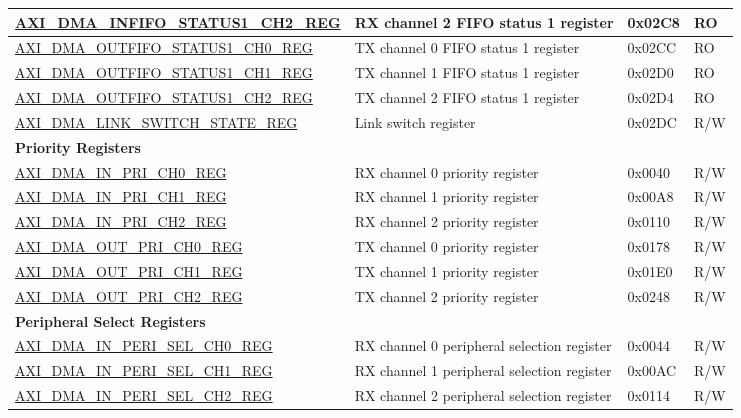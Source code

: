 \begin{longtable}{ | l | p{10cm} | p{1.3cm} | l | }
\hyperref[regdesc:AXIDMAINFIFOSTATUS1CHNREG]{AXI\_DMA\_INFIFO\_STATUS1\_CH2\_REG} & RX channel 2 FIFO status 1 register & 0x02C8 & RO \\ \hline
\hyperref[regdesc:AXIDMAOUTFIFOSTATUS1CHNREG]{AXI\_DMA\_OUTFIFO\_STATUS1\_CH0\_REG} & TX channel 0 FIFO status 1 register & 0x02CC & RO \\ \hline
\hyperref[regdesc:AXIDMAOUTFIFOSTATUS1CHNREG]{AXI\_DMA\_OUTFIFO\_STATUS1\_CH1\_REG} & TX channel 1 FIFO status 1 register & 0x02D0 & RO \\ \hline
\hyperref[regdesc:AXIDMAOUTFIFOSTATUS1CHNREG]{AXI\_DMA\_OUTFIFO\_STATUS1\_CH2\_REG} & TX channel 2 FIFO status 1 register & 0x02D4 & RO \\ \hline
\hyperref[regdesc:AXIDMALINKSWITCHSTATEREG]{AXI\_DMA\_LINK\_SWITCH\_STATE\_REG} & Link switch register & 0x02DC & R/W \\ \hline
\multicolumn{4}{|l|}{\textbf{Priority Registers}} \\ \hline
\hyperref[regdesc:AXIDMAINPRICHNREG]{AXI\_DMA\_IN\_PRI\_CH0\_REG} & RX channel 0 priority register & 0x0040 & R/W \\ \hline
\hyperref[regdesc:AXIDMAINPRICHNREG]{AXI\_DMA\_IN\_PRI\_CH1\_REG} & RX channel 1 priority register & 0x00A8 & R/W \\ \hline
\hyperref[regdesc:AXIDMAINPRICHNREG]{AXI\_DMA\_IN\_PRI\_CH2\_REG} & RX channel 2 priority register & 0x0110 & R/W \\ \hline
\hyperref[regdesc:AXIDMAOUTPRICHNREG]{AXI\_DMA\_OUT\_PRI\_CH0\_REG} & TX channel 0 priority register & 0x0178 & R/W \\ \hline
\hyperref[regdesc:AXIDMAOUTPRICHNREG]{AXI\_DMA\_OUT\_PRI\_CH1\_REG} & TX channel 1 priority register & 0x01E0 & R/W \\ \hline
\hyperref[regdesc:AXIDMAOUTPRICHNREG]{AXI\_DMA\_OUT\_PRI\_CH2\_REG} & TX channel 2 priority register & 0x0248 & R/W \\ \hline
\multicolumn{4}{|l|}{\textbf{Peripheral Select Registers}} \\ \hline
\hyperref[regdesc:AXIDMAINPERISELCHNREG]{AXI\_DMA\_IN\_PERI\_SEL\_CH0\_REG} & RX channel 0 peripheral selection register & 0x0044 & R/W \\ \hline
\hyperref[regdesc:AXIDMAINPERISELCHNREG]{AXI\_DMA\_IN\_PERI\_SEL\_CH1\_REG} & RX channel 1 peripheral selection register & 0x00AC & R/W \\ \hline
\hyperref[regdesc:AXIDMAINPERISELCHNREG]{AXI\_DMA\_IN\_PERI\_SEL\_CH2\_REG} & RX channel 2 peripheral selection register & 0x0114 & R/W \\ \hline

\end{longtable}
